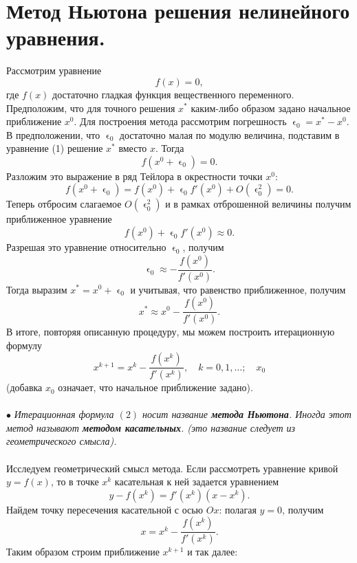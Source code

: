 \documentclass[a4paper, 12pt]{report}
\numberwithin{equation}{section}
\renewcommand{\varepsilon}{\upvarepsilon}
\begin{document}
	\section{Метод Ньютона решения нелинейного уравнения.}
	Рассмотрим уравнение 
	\begin{equation}
		f(x) = 0,
	\end{equation} где $f(x)$ достаточно гладкая функция вещественного переменного. Предположим, что для точного решения $x^*$ каким-либо образом задано начальное приближение $x^0$. Для построения метода рассмотрим погрешность $\varepsilon_0 = x^* - x^0$. В предположении, что $\varepsilon_0$ достаточно малая по модулю величина, подставим в уравнение (1) решение $x^*$ вместо $x$. Тогда $$f(x^0 + \varepsilon_0)=0.$$
	Разложим это выражение в ряд Тейлора в окрестности точки $x^0$:$$f(x^0 + \varepsilon_0) = f(x^0) + \varepsilon_0 f'(x^0) + O(\varepsilon_0^2) = 0.$$
	Теперь отбросим слагаемое $O(\varepsilon_0^2)$ и в рамках отброшенной величины получим приближенное уравнение $$f(x^0) + \varepsilon_0 f'(x^0)\approx 0.$$
	Разрешая это уравнение относительно $\varepsilon_0$, получим $$\varepsilon_0 \approx -\dfrac{f(x^0)}{f'(x^0)}.$$
	Тогда выразим $x^* = x^0 + \varepsilon_0$ и учитывая, что равенство приближенное, получим $$x^* \approx x^0 - \dfrac{f(x^0)}{f'(x^0)}.$$
	В итоге, повторяя описанную процедуру, мы можем построить итерационную формулу 
	\begin{equation}
		x^{k+1} = x^k - \dfrac{f(x^k)}{f'(x^k)},\quad k = 0,1,\ldots;\quad x_0
	\end{equation}
	(добавка $x_0$ означает, что начальное приближение задано).
	\\\\
	$\bullet$ \textit{Итерационная формула $(2)$ носит название \textbf{метода Ньютона}. Иногда этот метод называют \textbf{методом касательных}. (это название следует из геометрического смысла).}
	\\\\
	Исследуем геометрический смысл метода.
	Если рассмотреть уравнение кривой $y = f(x)$, то в точке $x^k$ касательная к ней задается уравнением $$y - f(x^k) = f'(x^k) (x-x^k).$$ Найдем точку пересечения касательной с осью $Ox$: полагая $y=0$, получим $$x= x^k - \dfrac{f(x^k)}{f'(x^k)}.$$ Таким образом строим приближение $x^{k+1}$ и так далее:
\end{document}
